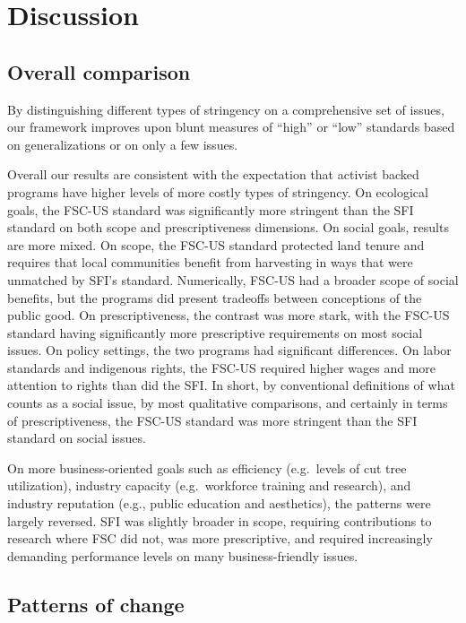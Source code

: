 \documentclass[
      12pt,
            Review ]{article}
\begin{document}
\section{Discussion}\label{discussion}

\subsection{Overall comparison}\label{overall-comparison}

By distinguishing different types of stringency on a comprehensive set
of issues, our framework improves upon blunt measures of ``high'' or
``low'' standards based on generalizations or on only a few issues.

Overall our results are consistent with the expectation that activist
backed programs have higher levels of more costly types of stringency.
On ecological goals, the FSC-US standard was significantly more
stringent than the SFI standard on both scope and prescriptiveness
dimensions. On social goals, results are more mixed. On scope, the
FSC-US standard protected land tenure and requires that local
communities benefit from harvesting in ways that were unmatched by SFI's
standard. Numerically, FSC-US had a broader scope of social benefits,
but the programs did present tradeoffs between conceptions of the public
good. On prescriptiveness, the contrast was more stark, with the FSC-US
standard having significantly more prescriptive requirements on most
social issues. On policy settings, the two programs had significant
differences. On labor standards and indigenous rights, the FSC-US
required higher wages and more attention to rights than did the SFI. In
short, by conventional definitions of what counts as a social issue, by
most qualitative comparisons, and certainly in terms of
prescriptiveness, the FSC-US standard was more stringent than the SFI
standard on social issues.

On more business-oriented goals such as efficiency (e.g.~levels of cut
tree utilization), industry capacity (e.g.~workforce training and
research), and industry reputation (e.g., public education and
aesthetics), the patterns were largely reversed. SFI was slightly
broader in scope, requiring contributions to research where FSC did not,
was more prescriptive, and required increasingly demanding performance
levels on many business-friendly issues.

\subsection{Patterns of change}\label{patterns-of-change}
\end{document}
